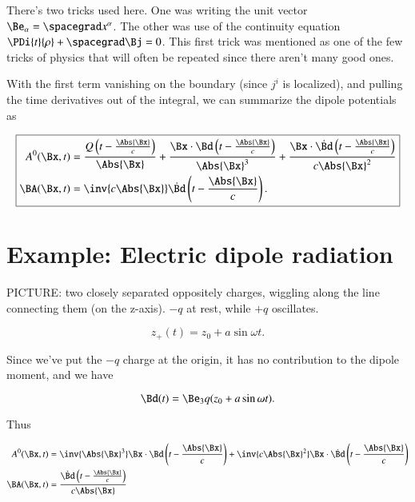 There's two tricks used here.  One was writing the unit vector $\Be_\alpha = \spacegrad x^\alpha$.  The other was use of the continuity equation $\PDi{t}{\rho} + \spacegrad \Bj = 0$.  This first trick was mentioned as one of the few tricks of physics that will often be repeated since there aren't many good ones.

With the first term vanishing on the boundary (since $j^i$ is localized), and pulling the time derivatives out of the integral, we can summarize the dipole potentials as

\begin{equation}\label{eqn:relativisticElectrodynamicsL20:250}
\boxed{
\begin{aligned}
A^0(\Bx, t) &= \frac{Q\left(t - \frac{\Abs{\Bx} }{c}\right)}{\Abs{\Bx} } + \frac{\Bx \cdot \Bd\left(t - \frac{\Abs{\Bx} }{c}\right)}{\Abs{\Bx}^3} + \frac{\Bx \cdot \dot{\Bd}\left(t - \frac{\Abs{\Bx} }{c}\right)}{c \Abs{\Bx}^2} \\
\BA(\Bx, t) &= \inv{c \Abs{\Bx} } \dot{\Bd}\left(t - \frac{\Abs{\Bx} }{c}\right).
\end{aligned}
}
\end{equation}

\section{Example: Electric dipole radiation}

PICTURE: two closely separated oppositely charges, wiggling along the line connecting them (on the z-axis).  $-q$ at rest, while $+q$ oscillates.

\begin{equation}\label{eqn:relativisticElectrodynamicsL20:270}
z_+(t) = z_0 + a \sin\omega t.
\end{equation}

Since we've put the $-q$ charge at the origin, it has no contribution to the dipole moment, and we have

\begin{equation}\label{eqn:relativisticElectrodynamicsL20:290}
\Bd(t) = \Be_3 q (z_0 + a \sin\omega t).
\end{equation}

Thus

\begin{align}\label{eqn:relativisticElectrodynamicsL20:310}
A^0(\Bx, t) &= \inv{\Abs{\Bx}^3} \Bx \cdot \Bd\left(t - \frac{\Abs{\Bx} }{c}\right) + \inv{c \Abs{\Bx}^2} \Bx \cdot \dot{\Bd}\left(t - \frac{\Abs{\Bx} }{c}\right) \\
\BA(\Bx, t) &= \frac{\dot{\Bd}\left(t - \frac{\Abs{\Bx} }{c}\right)}{c \Abs{\Bx} }
\end{align}

